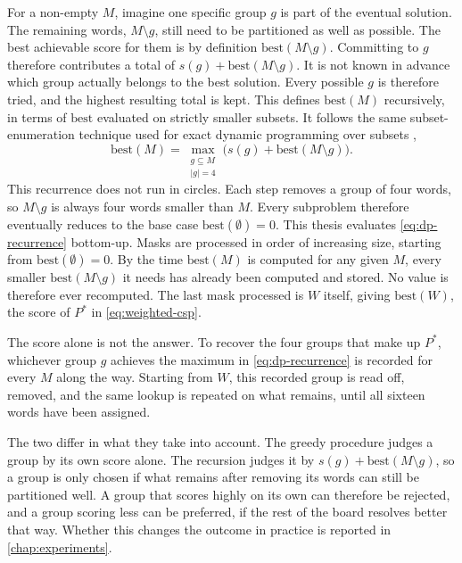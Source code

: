 For a non-empty $M$, imagine one specific group $g$ is part of the eventual solution. The remaining words, $M \setminus g$, still need to be partitioned as well as possible. The best achievable score for them is by definition $\text{best}(M \setminus g)$. Committing to $g$ therefore contributes a total of $s(g) + \text{best}(M \setminus g)$. It is not known in advance which group actually belongs to the best solution. Every possible $g$ is therefore tried, and the highest resulting total is kept. This defines $\text{best}(M)$ recursively, in terms of $\text{best}$ evaluated on strictly smaller subsets. It follows the same subset-enumeration technique used for exact dynamic programming over subsets \cite{heldkarpDynamicProgrammingApproach1962},
\begin{equation}
\text{best}(M) = \max_{\substack{g \subseteq M \\ |g| = 4}} \Big( s(g) + \text{best}(M \setminus g) \Big).
\label{eq:dp-recurrence}
\end{equation}
This recurrence does not run in circles. Each step removes a group of four words, so $M \setminus g$ is always four words smaller than $M$. Every subproblem therefore eventually reduces to the base case $\text{best}(\emptyset) = 0$. This thesis evaluates \autoref{eq:dp-recurrence} bottom-up. Masks are processed in order of increasing size, starting from $\text{best}(\emptyset) = 0$. By the time $\text{best}(M)$ is computed for any given $M$, every smaller $\text{best}(M \setminus g)$ it needs has already been computed and stored. No value is therefore ever recomputed. The last mask processed is $W$ itself, giving $\text{best}(W)$, the score of $P^*$ in \autoref{eq:weighted-csp}.

The score alone is not the answer. To recover the four groups that make up $P^*$, whichever group $g$ achieves the maximum in \autoref{eq:dp-recurrence} is recorded for every $M$ along the way. Starting from $W$, this recorded group is read off, removed, and the same lookup is repeated on what remains, until all sixteen words have been assigned.

The two differ in what they take into account. The greedy procedure judges a group by its own score alone. The recursion judges it by $s(g) + \text{best}(M \setminus g)$, so a group is only chosen if what remains after removing its words can still be partitioned well. A group that scores highly on its own can therefore be rejected, and a group scoring less can be preferred, if the rest of the board resolves better that way. Whether this changes the outcome in practice is reported in \autoref{chap:experiments}.

